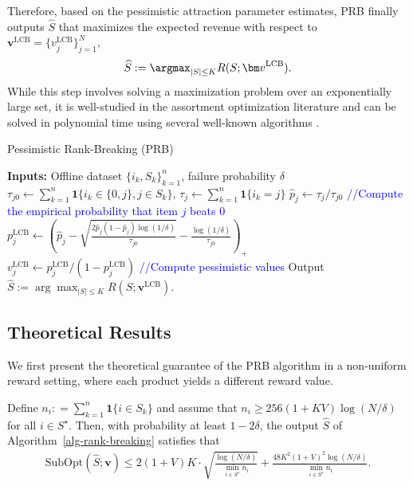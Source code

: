 \documentclass[10pt, letterpaper]{article}
\begin{document}
Therefore, based on the pessimistic attraction parameter estimates, PRB finally outputs $\widehat{S}$ that maximizes the expected revenue with respect to ${\bm v}^{\mathrm{LCB}} = \{v_j^{\mathrm{LCB}}\}_{j = 1}^N$,
\begin{align*}
    \widehat{S}:= \argmax_{\lvert S \rvert \leq K} R(S;{\bm v}^{\mathrm{LCB}}).
\end{align*}
While this step involves solving a maximization problem over an exponentially large set, it is well-studied in the assortment optimization literature and can be solved in polynomial time using several well-known algorithms \citep{rusmevichientong2010dynamic, davis2013assortment, avadhanula2016tightness}.




\begin{algorithm}[t]
\caption{Pessimistic Rank-Breaking (PRB)} \label{alg-rank-breaking}
\begin{algorithmic}[1]
\STATE \textbf{Inputs:} Offline dataset $\{i_k, S_k\}_{k = 1}^n$, failure probability $\delta$
    \STATE $\tau_{j0} \leftarrow \sum_{k=1}^n \mathbf{1}\{i_k \in \{0, j\}, j \in S_k\}$, $\tau_j \leftarrow \sum_{k=1}^n \mathbf{1}\{i_k = j\}$
    \STATE $\widehat{p}_j \leftarrow \tau_j / \tau_{j0}$ \textcolor{blue}{//Compute the empirical probability that item $j$ beats $0$}
    \STATE $p_j^{\text{LCB}} \leftarrow \left(\widehat{p}_j - \sqrt{\frac{2\widehat{p}_j(1-\widehat{p}_j)\log(1/\delta)}{\tau_{j0}}} - \frac{\log(1/\delta)}{\tau_{j0}}\right)_+$\\ \STATE $v_j^{\text{LCB}} \leftarrow p_j^{\text{LCB}} / (1 - p_j^{\text{LCB}})$ \textcolor{blue}{//Compute pessimistic values}
\ENDFOR
\STATE  Output $\widehat{S}:= \arg\max_{\lvert S \rvert \leq K} R(S;{\bm v}^{\mathrm{LCB}})$.
\end{algorithmic}
\end{algorithm}

\subsection{Theoretical Results}

We first present the theoretical guarantee of the PRB algorithm in a non-uniform reward setting, where each product yields a different reward value.

\begin{theorem}\label{thm-upper-bound-non-uniform}  
Define $n_i: = \sum_{k = 1}^n \bm{1}\{i\in S_k\}$ and assume that $n_i\geq 256(1+KV)\log(N/\delta)$ for all $i\in S^\star$. Then, with probability at least $1-2\delta$, the output $\widehat{S}$ of Algorithm~\ref{alg-rank-breaking} satisfies that
\begin{align*}
        \mathrm{SubOpt}( \widehat{S}; \bm{v})  \le  2(1+V)K\cdot \sqrt{\frac{\log (N/\delta)}{\min_{i\in S^\star}n_i}} + \frac{48K^2(1+V)^2\log(N/\delta)}{\min_{i\in S^\star} n_i}.
\end{align*}
\end{theorem}
\end{document}

